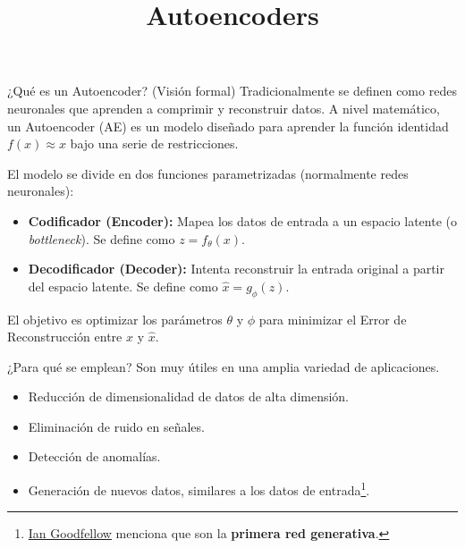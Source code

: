 



\newcommand{\mytitle}{Autoencoders}
\title{\mytitle}


\maketitle

\begin{frame}{¿Qué es un Autoencoder? (Visión formal)}
Tradicionalmente se definen como redes neuronales que aprenden a comprimir y reconstruir datos. A nivel matemático, un \alert{Autoencoder (AE)} es un modelo diseñado para aprender la \alert{función identidad} $f(x) \approx x$ bajo una serie de restricciones.

El modelo se divide en dos funciones parametrizadas (normalmente redes neuronales):
\begin{itemize}
    \item \textbf{Codificador (Encoder):} Mapea los datos de entrada a un espacio latente (o \textit{bottleneck}). Se define como \alert{$z = f_\theta(x)$}.
    \item \textbf{Decodificador (Decoder):} Intenta reconstruir la entrada original a partir del espacio latente. Se define como \alert{$\hat{x} = g_\phi(z)$}.
\end{itemize}

El objetivo es optimizar los parámetros $\theta$ y $\phi$ para minimizar el \alert{Error de Reconstrucción} entre $x$ y $\hat{x}$.
\end{frame}

\begin{frame}{¿Para qué se emplean?}
Son muy útiles en una amplia variedad de aplicaciones.

\begin{itemize}
    \item Reducción de dimensionalidad de datos de alta dimensión.
    \item Eliminación de ruido en señales.
    \item Detección de anomalías.
    \item Generación de nuevos datos, similares a los datos de entrada\footnote{\href{https://scholar.google.es/citations?hl=es&user=iYN86KEAAAAJ}{Ian Goodfellow} menciona que son la \textbf{primera red generativa}.}.
\end{itemize}
\end{frame}


